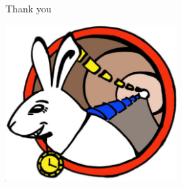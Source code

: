 \documentclass[compress,red]{beamer}
\begin{document}
\subsection{}
\begin{frame}{Thank you}


    
    \begin{center}
    \includegraphics[height=6.0cm]{logo/WRlogo.pdf}
    \end{center}

\end{frame}
\end{document}
